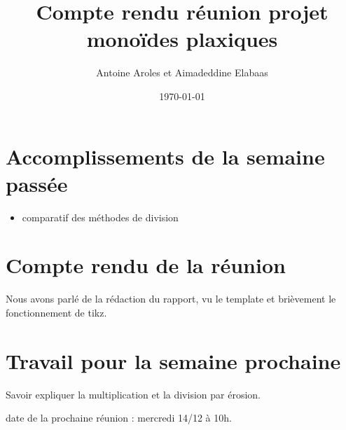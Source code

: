 \documentclass[a4paper,12pt]{article}
\title{Compte rendu réunion projet monoïdes plaxiques}  %
\author{Antoine Aroles et Aimadeddine Elabaas}
\date{\today}  %
\begin{document}
\maketitle
\section{Accomplissements de la semaine passée}
\begin{itemize}
\item comparatif des méthodes de division
\end{itemize}
\section{Compte rendu de la réunion}
Nous avons parlé de la rédaction du rapport, vu le template et brièvement le fonctionnement de tikz. 
\section{Travail pour la semaine prochaine}
Savoir expliquer la multiplication et la division par érosion.

\noindent
date de la prochaine réunion : mercredi 14/12 à 10h.
\end{document}
